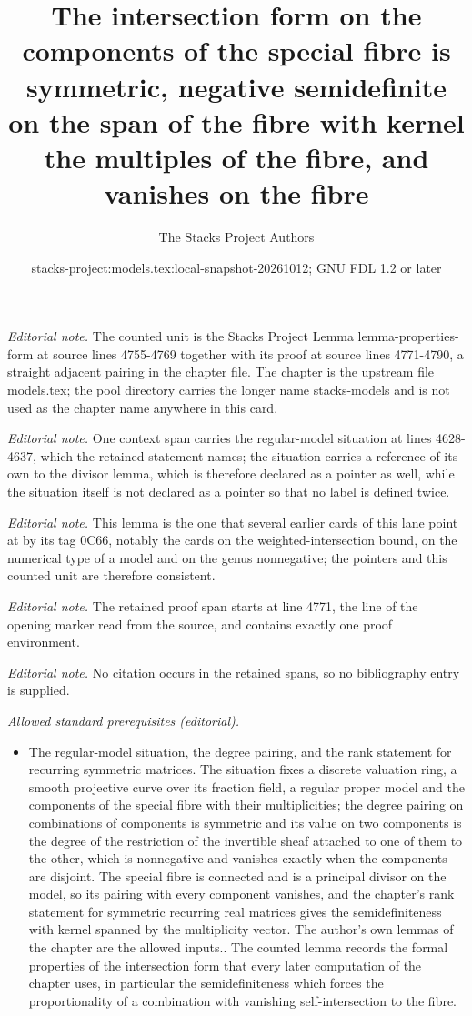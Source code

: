 \documentclass[10pt,a4paper]{amsart}
\title{The intersection form on the components of the special fibre is symmetric, negative semidefinite on the span of the fibre with kernel the multiples of the fibre, and vanishes on the fibre}
\author{The Stacks Project Authors}
\date{stacks-project:models.tex:local-snapshot-20261012; GNU FDL 1.2 or later}
\theoremstyle{plain}
\theoremstyle{definition}
\theoremstyle{remark}
\numberwithin{equation}{subsection}
\begin{document}
\maketitle
\noindent\textit{Editorial note.} The counted unit is the Stacks Project Lemma lemma-properties-form at source lines 4755-4769 together with its proof at source lines 4771-4790, a straight adjacent pairing in the chapter file. The chapter is the upstream file models.tex; the pool directory carries the longer name stacks-models and is not used as the chapter name anywhere in this card.\par\medskip
\noindent\textit{Editorial note.} One context span carries the regular-model situation at lines 4628-4637, which the retained statement names; the situation carries a reference of its own to the divisor lemma, which is therefore declared as a pointer as well, while the situation itself is not declared as a pointer so that no label is defined twice.\par\medskip
\noindent\textit{Editorial note.} This lemma is the one that several earlier cards of this lane point at by its tag 0C66, notably the cards on the weighted-intersection bound, on the numerical type of a model and on the genus nonnegative; the pointers and this counted unit are therefore consistent.\par\medskip
\noindent\textit{Editorial note.} The retained proof span starts at line 4771, the line of the opening marker read from the source, and contains exactly one proof environment.\par\medskip
\noindent\textit{Editorial note.} No citation occurs in the retained spans, so no bibliography entry is supplied.\par\medskip
\noindent\textit{Allowed standard prerequisites (editorial).}\begin{itemize}
\item The regular-model situation, the degree pairing, and the rank statement for recurring symmetric matrices. The situation fixes a discrete valuation ring, a smooth projective curve over its fraction field, a regular proper model and the components of the special fibre with their multiplicities; the degree pairing on combinations of components is symmetric and its value on two components is the degree of the restriction of the invertible sheaf attached to one of them to the other, which is nonnegative and vanishes exactly when the components are disjoint. The special fibre is connected and is a principal divisor on the model, so its pairing with every component vanishes, and the chapter's rank statement for symmetric recurring real matrices gives the semidefiniteness with kernel spanned by the multiplicity vector. The author's own lemmas of the chapter are the allowed inputs.. The counted lemma records the formal properties of the intersection form that every later computation of the chapter uses, in particular the semidefiniteness which forces the proportionality of a combination with vanishing self-intersection to the fibre.
\end{itemize}\medskip
\end{document}
